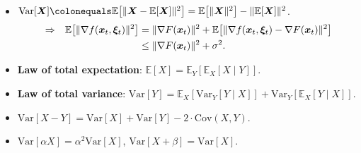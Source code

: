 \documentclass[8pt,a4paper]{extarticle}
\newcommand{\lft}{\mathopen{}\mathclose\bgroup\left}
\newcommand{\rgt}{\aftergroup\egroup\right}
\newcommand{\E}{\mathbb{E}}
\newcommand{\Var}{\mathrm{Var}}
\renewcommand{\vec}[1]{\bm{#1}}
\newenvironment{topic}[1]
{\textbf{\sffamily \colorbox{black}{\rlap{\textbf{\textcolor{white}{#1}}}\hspace{\linewidth}\hspace{-2\fboxsep}}} \\ \vspace{0.2cm}}
{}
\begin{document}
\begin{multicols*}{2}
    \begin{topic}{Expectation and variance for SGD}
        \begin{itemize}
            \item $\Var[\vec{X}] \colonequals \E \lft[ \| \vec{X} - \E[\vec{X}] \|^2 \rgt] = \E \lft[ \| \vec{X} \|^2 \rgt] - \| \E[\vec{X}] \|^2$. \\
                  \begin{align*}
                       & \Rightarrow & \E \lft[ \| \nabla f(\vec{x}_t, \vec{\xi}_t) \|^2 \rgt] & = \| \nabla F(\vec{x}_t) \|^2 + \E \lft[ \| \nabla f(\vec{x}_t, \vec{\xi}_t) - \nabla F(\vec{x}_t) \|^2 \rgt] \\
                       &             &                                                         & \leq \| \nabla F(\vec{x}_t) \|^2 + \sigma^2.
                  \end{align*}
            \item \textbf{Law of total expectation}: $\E[X] = \E_Y[\E_X[X \mid Y]]$.
            \item \textbf{Law of total variance}: $\Var[Y] = \E_X[\Var_Y[Y \mid X]] + \Var_Y[\E_X[Y \mid X]]$.
            \item $\Var[X-Y] = \Var[X] + \Var[Y] - 2 \cdot \mathrm{Cov}(X, Y)$.
            \item $\Var[\alpha X] = \alpha^2 \Var[X]$, $\Var[X + \beta] = \Var[X]$.
        \end{itemize}
    \end{topic}


\end{multicols*}
\end{document}
